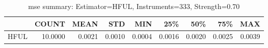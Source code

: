 \begin{table}[ht]
\centering
\caption{mse summary: Estimator=HFUL, Instruments=333, Strength=0.70}
\begin{tabular}{lrrrrrrrr}
\toprule
 & COUNT & MEAN & STD & MIN & 25\% & 50\% & 75\% & MAX \\
\midrule
HFUL & 10.0000 & 0.0021 & 0.0010 & 0.0004 & 0.0016 & 0.0020 & 0.0025 & 0.0039 \\
\bottomrule
\end{tabular}
\end{table}
